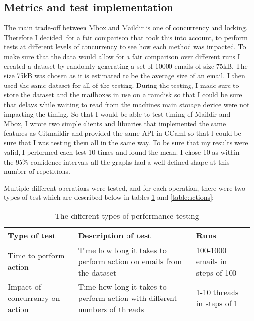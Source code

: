 \subsection{Metrics and test implementation}

The main trade-off between Mbox and Maildir is one of concurrency and locking. Therefore I decided, for a fair comparison that took this into account, to perform tests at different levels of concurrency to see how each method was impacted. To make sure that the data would allow for a fair comparison over different runs I created a dataset by randomly generating a set of 10000 emails of size 75kB. The size 75kB was chosen as it is estimated to be the average size of an email\cite{email_size}. I then used the same dataset for all of the testing. During the testing, I made sure to store the dataset and the mailboxes in use on a ramdisk so that I could be sure that delays while waiting to read from the machines main storage device were not impacting the timing. So that I would be able to test timing of Maildir and Mbox, I wrote two simple clients and libraries that implemented the same features as Gitmaildir and provided the same API in OCaml so that I could be sure that I was testing them all in the same way. To be sure that my results were valid, I performed each test 10 times and found the mean. I chose 10 as within the 95\% confidence intervals all the graphs had a well-defined shape at this number of repetitions.

Multiple different operations were tested, and for each operation, there were two types of test which are described below in tables \ref{table:tests} and \ref{table:actions}:

\begin{table}[h]
\footnotesize
\centering
\begin{tabular}{p{3.5cm} p{7.5cm} p{3cm}}
  \toprule
  Type of test & Description of test & Runs \\
  \midrule
  Time to perform action & Time how long it takes to perform action on emails from the dataset & 100-1000 emails in steps of 100 \\
  Impact of concurrency on action & Time how long it takes to perform action with different numbers of threads & 1-10 threads in steps of 1 \\
  \bottomrule
\end{tabular}
\caption{The different types of performance testing}
\label{table:tests}
\end{table}

